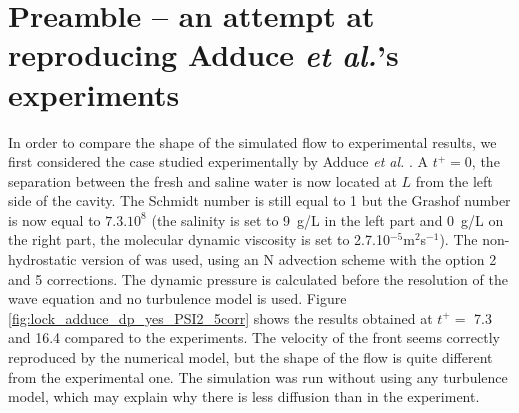 \section{Preamble -- an attempt at reproducing Adduce \textit{et al.}'s experiments}\label{sec:adduce}

In order to compare the shape of the simulated flow to experimental results,
we first considered the case studied experimentally by Adduce \textit{et al.}
\cite{Adduce2012}.
A $t^+=0$, the separation between the fresh and saline water is now located at
$L$ from the left side of the cavity.
The Schmidt number is still equal to 1 but the Grashof number is now
equal to $7.3.10^{8}$ (the salinity is set to 9~g/L in the left part and 0~g/L
on the right part,
the molecular dynamic viscosity is set to 2.7.10$^{-5}$m$^2$s$^{-1}$).
The non-hydrostatic version of  was used, using an N
advection scheme with the option 2 and 5 corrections.
The dynamic pressure is calculated before the resolution of the
wave equation and no turbulence model is used.
Figure \ref{fig:lock_adduce_dp_yes_PSI2_5corr} shows the
results obtained at $t^+=$ 7.3 and 16.4 compared to the experiments.
The velocity of the front seems correctly reproduced by the numerical model,
but the shape of the flow is quite different from the experimental one.
The simulation was run without using any turbulence model,
which may explain why there is less diffusion than in the experiment.
